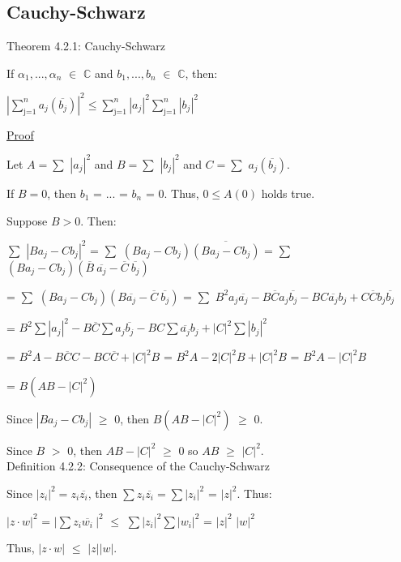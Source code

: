 \subsection{Cauchy-Schwarz} 

{ \color{red} Theorem 4.2.1: Cauchy-Schwarz } 

	\qquad If $\alpha_1 , ... , \alpha_n$ $\in$ $\mathbb{C}$ and $b_1 , ... , b_n$ $\in$
	$\mathbb{C}$, then:

	\qquad \qquad $| \sum_{\text{j=1}}^{n} a_j(\overline{b_j})  |^2 \leq
	\sum_{\text{j=1}}^{n} |a_j|^2 \sum_{\text{j=1}}^{n} |b_j|^2 $

{ \color{magenta} \underline{Proof} } 

	Let $A = \sum$ $|a_j|^2$ and $B = \sum$ $|b_j|^2$ and $C = \sum$ $a_j(\overline{b_j})$.

	If $B = 0$, then $b_1$ = ... = $b_n$ = 0. Thus, $0 \leq A(0)$ holds true.

	Suppose $B > 0$. Then:

	\qquad $\sum$ $|Ba_j - Cb_j|^2$ = $\sum$ $(Ba_j - Cb_j)\overline{(Ba_j - Cb_j)}$
	= $\sum$ $(Ba_j - Cb_j)(\overline{B} \ \overline{a_j} - \overline{C} \ \overline{b_j})$

	\qquad = $\sum$ $(Ba_j-Cb_j)(B\overline{a_j}-\overline{C} \ \overline{b_j})$
	= $\sum$ $B^2a_j\overline{a_j} - B\overline{C}a_j\overline{b_j} - BC\overline{a_j}b_j
	+ C\overline{C}b_j\overline{b_j}$

		\qquad = $B^2 \sum |a_j|^2 - B\overline{C}\sum a_j\overline{b_j}
	- BC \sum \overline{a_j}b_j+ |C|^2 \sum |b_j|^2$

	\qquad = $B^2A - B\overline{C}C - BC\overline{C} + |C|^2B$
	= $B^2A - 2|C|^2B + |C|^2B$ = $B^2A -|C|^2B$

	\qquad = $B(AB - |C|^2)$

	Since $| Ba_j - Cb_j |$ $\geq$ 0, then $B(AB - |C|^2)$ $\geq$ 0.

	Since $B$ $>$ 0, then $AB - |C|^2$ $\geq$ 0 so $AB$ $\geq$ $|C|^2$. \\

{ \color{blue} Definition 4.2.2: Consequence of the Cauchy-Schwarz } 

	\qquad Since $|z_i|^2 = z_i\overline{z_i}$, then
	$\sum z_i\overline{z_i} = \sum |z_i|^2$ = $|z|^2$. Thus:

	\qquad \qquad $|z \cdot w|^2$ = $|\sum z_i\overline{w_i} \ |^2$
	$\leq$ $\sum |z_i|^2 \sum |w_i|^2$ = $|z|^2$ $|w|^2$
	
	\qquad Thus, $|z \cdot w|$ $\leq$ $|z| |w|$.

